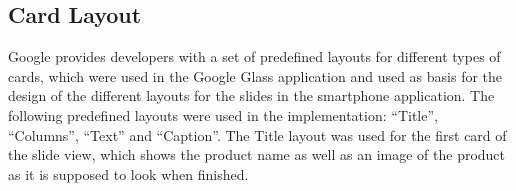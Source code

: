 






\subsection{Card Layout}
Google provides developers with a set of predefined layouts for different types of cards, which were used in the Google Glass application and used as basis for the design of the different layouts for the slides in the smartphone application. The following predefined layouts were used in the implementation: ``Title'', ``Columns'', ``Text'' and ``Caption''. The Title layout was used for the first card of the slide view, which shows the product name as well as an image of the product as it is supposed to look when finished. 

